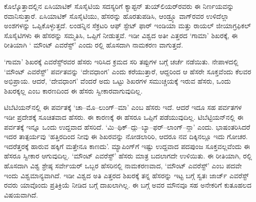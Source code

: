 ಕೊಲ್ಕೊತ್ತಾದಲ್ಲಿನ ಏಸಿಯಾಟಿಕ್​ ಸೊಸೈಟಿಯ ಸದಸ್ಯರಿಗೆ ಕ್ಯಾಪ್ಟನ್​ ತುಯ್​ಲಿಯರ್​\-ರವರು ಈ ನಿರ್ಣಯವನ್ನು ರವಾನಿಸುತ್ತಾರೆ. ಏಸಿಯಾಟಿಕ್​ ಸೊಸೈಟಿಯು, ಹೆಸರನ್ನು ಹೊರತುಪಡಿಸಿ, ಆಂಡ್ರ್ಯೂ ವಾಗ್​ರವರ ಉಳಿದೆಲ್ಲಾ ಅಂಶಗಳನ್ನು ಒಪ್ಪಿಕೊಳ್ಳುತ್ತದೆ. ಲಂಡನ್ನಿನ ಸೆಕ್ರಟರಿ ಆಫ್​ ಸ್ಟೇಟ್​ ಫಾರ್​ ಇಂಡಿಯಾ ಮತ್ತು ರಾಯಲ್​ ಜೀಯಾಗ್ರಫಿಕಲ್​ ಸೊಸೈಟಿಗಳು ಈ ಹೆಸರನ್ನು ಸಮ್ಮತಿಸಿ, ಒಪ್ಪಿಗೆ ನೀಡುತ್ತವೆ. ಇಡೀ ವಿಶ್ವದ ಅತೀ ಎತ್ತರದ ‘ಗಾಮಾ’ ಶಿಖರಕ್ಕೆ, ಈ ರೀತಿಯಾಗಿ ‘ ಮೌಂಟ್​ ಎವರೆಸ್ಟ್​’ ಎಂದು  ರಲ್ಲಿ ಹೊಸದಾಗಿ ನಾಮಕರಣ ವಾಗುತ್ತದೆ.

‘ಗಾಮಾ’ ಶಿಖರಕ್ಕೆ ಎವರೆಸ್ಟ್​ರವರ ಹೆಸರು ಇರಿಸಿದ ಕ್ರಮದ ಸರಿ ತಪ್ಪುಗಳ ಬಗ್ಗೆ ಚರ್ಚೆ ನಡೆಯಿತು. ನೇಪಾಳದಲ್ಲಿ `ಮೌಂಟ್​ ಎವರೆಸ್ಟ್​’ ಪರ್ವತವನ್ನು ‘ದೇವಧಾಂಗ’ ಎಂದು ಕರೆಯುತ್ತಾರೆ, ಆದ್ದರಿಂದ ಆ ಹೆಸರೇ ಸೂಕ್ತವೆಂದು ಕೆಲವರ ಅಭಿಪ್ರಾಯ. ಆದರೆ, ‘ದೇವಧಾಂಗ’ ವೆಂದರೆ ಅದು ಒಟ್ಟು ಶಿಖರಗಳ ಸಮುಚ್ಚಯಕ್ಕೆ ಇರುವ ಹೆಸರು, ಒಂದು ಶಿಖರಕ್ಕಲ್ಲ ಎಂಬ ಕಾರಣದಿಂದ ಈ ಹೆಸರು ಸ್ವೀಕಾರವಾಗುವುದಿಲ್ಲ.

ಟಿಬೆಟಿಯನ್​ನಲ್ಲಿ ಈ ಪರ್ವತಕ್ಕೆ ‘ಚಾ–ಮೊ–ಲುಂಗ್​–ಮಾ’ ಎಂಬ ಹೆಸರು ಇದೆ. ಆದರೆ ಇದೂ ಸಹ ಪರ್ವತಗಳ ಇಡೀ ಪ್ರದೇಶಕ್ಕೆ ಸೂಚಿತವಾದ ಹೆಸರು. ಈ ಕಾರಣಕ್ಕೆ ಈ ಹೆಸರೂ ಒಪ್ಪಿಗೆ ಪಡೆಯುವುದಿಲ್ಲ. ಟಿಬೆಟ್ಟಿಯನ್​ನಲ್ಲಿ ಈ ಪರ್ವತಕ್ಕೆ ಇನ್ನೂ ಒಂದು ಉದ್ದವಾದ ಹೆಸರಿದೆ. ‘ಮಿ–ಥಿಕ್​–ದ್ಗು–ಬ್ಯಾ–ಫರ್​–ಲಾಂಗ್​–ನ್ಗಾ’ ಎಂದು. ಭಾಷಂತರಿಸಿದರೆ ಇದರ ತಾತ್ಪರ್ಯವು ‘ಹತ್ತಿರದಿಂದ ನೀವು ಈ ಶಿಖರವನ್ನು ನೋಡಲಾರಿರಿ, ಆದರೂ ನವ ದಿಕ್ಕಿನಲ್ಲೂ ಇದು ಗೋಚರ. ಇದರೆತ್ತರಕ್ಕೆ ಹಾರುವ ಹಕ್ಕಿಗೆ ಮತ್ತೇನೂ ಕಾಣದು’. ಮ್ಯಾಪಿಂಗ್​ಗೆ ಇಷ್ಟು ಉದ್ದವಾದ ಪದಪುಂಜ ಸೂಕ್ತವಲ್ಲವೆಂದು ಈ ಹೆಸರೂ ಸ್ವೀಕಾರ ಆಗುವುದಿಲ್ಲ. ‘ಮೌಂಟ್​​ ಎವರೆಸ್ಟ್​’ ಹೆಸರು ಮಾತ್ರ ಬದಲಾಗದೇ ಉಳಿಯಿತು. ಈ ರೀತಿಯಾಗಿ,  ರಲ್ಲಿ ಹೊಸದಾಗಿ ವಿಶ್ವ ಶ್ರೇಷ್ಠ ಸರ್ವೇಯರ್​ ಒಬ್ಬರ ಹೆಸರಿನಲ್ಲಿ ನಾಮಕರಣವಾದ, `ಮೌಂಟ್​ ಎವರೆಸ್ಟ್​’ ಎಂಬ ಪದವೇ ಇಂದು ವಿಶ್ವಮಾನ್ಯವಾಗಿದೆ. ಇಡೀ ವಿಶ್ವದ ಅತಿ ಎತ್ತರದ ಶಿಖರಕ್ಕೆ ತನ್ನ ಹೆಸರನ್ನು ಇಟ್ಟ ಬಗ್ಗೆ ಸ್ವತಃ ಜಾರ್ಜ್ ಎವರೆಸ್ಟ್​ರವರು ಯಾವೊಂದು ಪ್ರತಿಕ್ರಿಯೆ ನೀಡಿದ ಬಗ್ಗೆ ದಾಖಲಾಗಿಲ್ಲ. ಈ ಬಗ್ಗೆ ಅವರ ಮೌನವೂ ಸಹ ಅನೇಕರಿಗೆ ಕುತೂಹಲದ ವಿಷಯವಾಗಿದೆ.

